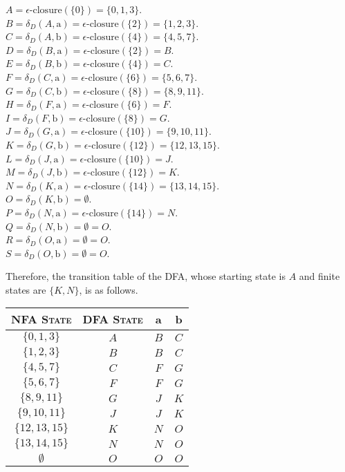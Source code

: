 \documentclass{CompilerAssignment}
\newcommand{\eclose}{\epsilon\text{-closure}}
\newcommand{\dtran}{\delta_D}
\begin{document}
\begin{enumerate}
    $A = \eclose(\{0\}) = \{0, 1, 3\}$.\\
    $B = \dtran(A, \text{a}) = \eclose(\{2\}) = \{1, 2, 3\}$.\\
    $C = \dtran(A, \text{b}) = \eclose(\{4\}) = \{4, 5, 7\}$.\\
    $D = \dtran(B, \text{a}) = \eclose(\{2\}) = B$.\\
    $E = \dtran(B, \text{b}) = \eclose(\{4\}) = C$.\\
    $F = \dtran(C, \text{a}) = \eclose(\{6\}) = \{5, 6, 7\}$.\\
    $G = \dtran(C, \text{b}) = \eclose(\{8\}) = \{8, 9, 11\}$.\\
    $H = \dtran(F, \text{a}) = \eclose(\{6\}) = F$.\\
    $I = \dtran(F, \text{b}) = \eclose(\{8\}) = G$.\\
    $J = \dtran(G, \text{a}) = \eclose(\{10\}) = \{9, 10, 11\}$.\\
    $K = \dtran(G, \text{b}) = \eclose(\{12\}) = \{12, 13, 15\}$.\\
    $L = \dtran(J, \text{a}) = \eclose(\{10\}) = J$.\\
    $M = \dtran(J, \text{b}) = \eclose(\{12\}) = K$.\\
    $N = \dtran(K, \text{a}) = \eclose(\{14\}) = \{13, 14, 15\}$.\\
    $O = \dtran(K, \text{b}) = \emptyset$.\\
    $P = \dtran(N, \text{a}) = \eclose(\{14\}) = N$.\\
    $Q = \dtran(N, \text{b}) = \emptyset = O$.\\
    $R = \dtran(O, \text{a}) = \emptyset = O$.\\
    $S = \dtran(O, \text{b}) = \emptyset = O$.

    Therefore, the transition table of the DFA, whose starting state is $A$ and finite states are \(\{K, N\}\), is as follows.

    \begin{center}
        \begin{tabular}{cccc}
            \toprule
            \textsc{NFA State} & \textsc{DFA State} & a & b\\
            \midrule
            \(\{0, 1, 3\} \) & $A$ & $B$ & $C$\\
            \(\{1, 2, 3\} \) & $B$ & $B$ & $C$\\
            \(\{4, 5, 7\} \) & $C$ & $F$ & $G$\\
            \(\{5, 6, 7\} \) & $F$ & $F$ & $G$\\
            \(\{8, 9, 11\} \) & $G$ & $J$ & $K$\\
            \(\{9, 10, 11\} \) & $J$ & $J$ & $K$\\
            \(\{12, 13, 15\} \) & $K$ & $N$ & $O$\\
            \(\{13, 14, 15\} \) & $N$ & $N$ & $O$\\
            \(\emptyset \) & $O$ & $O$ & $O$\\
            \bottomrule
        \end{tabular}
    \end{center}


\end{enumerate}
\end{document}
